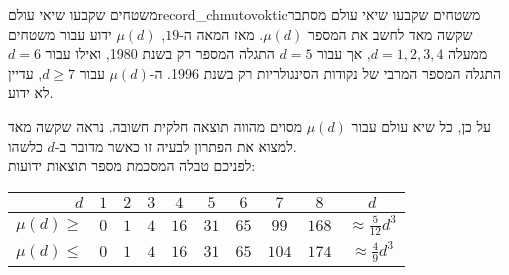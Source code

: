 \begin{surferIntroPage}{משטחים שקבעו שיאי עולם}{record_chmutovoktic}{משטחים שקבעו שיאי עולם}
 מסתבר שקשה מאד לחשב את המספר $\mu(d)$.
    מאז המאה ה-$19$, $\mu(d)$ ידוע עבור משטחים ממעלה $d=1,2,3,4$, אך עבור $d=5$
    התגלה המספר רק בשנת 1980, ואילו עבור $d=6$ התגלה המספר המרבי של נקודות הסינגולריות רק בשנת 1996.
    ה-$\mu(d)$ עבור $d\ge 7$, עדיין לא ידוע.
  
    על כן, כל שיא עולם עבור $\mu(d)$ מסוים מהווה תוצאה חלקית חשובה. נראה שקשה מאד למצוא את הפתרון לבעיה זו כאשר מדובר ב-$d$ כלשהו.\\  לפניכם טבלה המסכמת מספר תוצאות ידועות:
    
   \begin{center}
      \begin{tabular}{r|cccccccc|c}
        $d$ & $1$ & $2$ & $3$ & $4$ & $5$ & $6$ & $7$ & $8$ & $d$\\
        \hline
        \hline
        \rule{0pt}{1.2em}$\mu(d)\ge$ & $0$ & $1$ & $4$ & $16$ & $31$ & $65$ &
        $99$ & $168$ & 
        $\approx \frac{5}{12}d^3$\\[0.3em]
        \hline
        \rule{0pt}{1.2em}$\mu(d)\le$ & $0$ & $1$ & $4$ & $16$ & $31$ & $65$ &
        $104$ & $174$ & $\approx \frac{4}{9}d^3$
      \end{tabular}
    \end{center}
\end{surferIntroPage}
